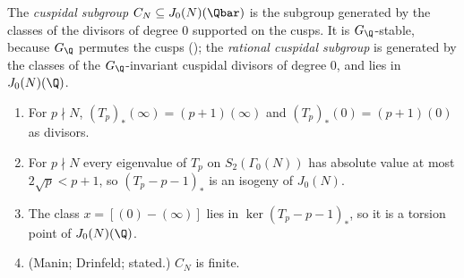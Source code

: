 \begin{definition}\label{def:moddeg:cuspidal-subgroup}
The \emph{cuspidal subgroup} $C_N\subseteq J_0(N)(\Qbar)$ is the subgroup generated by the classes of the divisors of degree $0$ supported on the cusps. It is $G_\Q$-stable, because $G_\Q$ permutes the
cusps (); the \emph{rational cuspidal subgroup} is generated by the classes of the $G_\Q$-invariant cuspidal divisors of degree $0$, and lies in $J_0(N)(\Q)$.
\end{definition}

\begin{proposition}\label{prop:moddeg:manin-drinfeld}
\leavevmode
\begin{enumerate}[label=(\roman*)]
\item For $p\nmid N$, $(T_p)_*(\infty)=(p+1)(\infty)$ and $(T_p)_*(0)=(p+1)(0)$ as divisors.
\item For $p\nmid N$ every eigenvalue of $T_p$ on $S_2(\Gamma_0(N))$ has absolute value at most $2\sqrt p<p+1$, so $(T_p-p-1)_*$ is an isogeny of $J_0(N)$.
\item The class $x=[(0)-(\infty)]$ lies in $\ker(T_p-p-1)_*$, so it is a torsion point of $J_0(N)(\Q)$.
\item (Manin; Drinfeld; stated.) $C_N$ is finite.
\end{enumerate}
\end{proposition}


